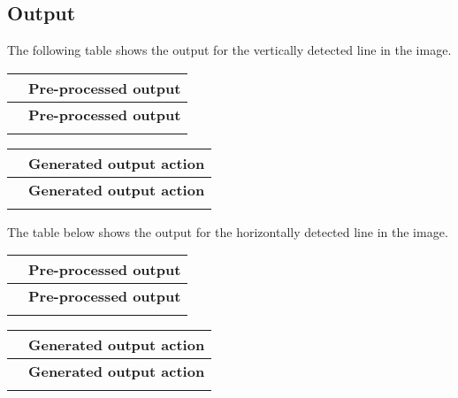 \subsection*{Output}

The following table shows the output for the vertically detected line in the image.

\tabulinesep=1mm
\begin{longtabu} spread 0pt [c]{*2{|X[-1]}|}
\hline
{}&{\bf Pre-\/processed output  }\\
\endfirsthead
\hline
\endfoot
\hline
{}&{\bf Pre-\/processed output  }\\
\endhead
 & \\
\end{longtabu}


\tabulinesep=1mm
\begin{longtabu} spread 0pt [c]{*2{|X[-1]}|}
\hline
{}&{\bf Generated output action  }\\
\endfirsthead
\hline
\endfoot
\hline
{}&{\bf Generated output action  }\\
\endhead
 & \\
\end{longtabu}


The table below shows the output for the horizontally detected line in the image.

\tabulinesep=1mm
\begin{longtabu} spread 0pt [c]{*2{|X[-1]}|}
\hline
{}&{\bf Pre-\/processed output  }\\
\endfirsthead
\hline
\endfoot
\hline
{}&{\bf Pre-\/processed output  }\\
\endhead
 & \\
\end{longtabu}


\tabulinesep=1mm
\begin{longtabu} spread 0pt [c]{*2{|X[-1]}|}
\hline
{}&{\bf Generated output action  }\\
\endfirsthead
\hline
\endfoot
\hline
{}&{\bf Generated output action  }\\
\endhead
 & \\
\end{longtabu}
